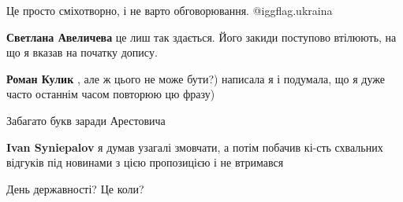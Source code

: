 \begin{itemize}
Це просто сміхотворно, і не варто обговорювання. @igg{flag.ukraina}

\begin{itemize}
 
\textbf{Светлана Авеличева} це лиш так здається. Його закиди поступово втілюють, на що я вказав на початку допису.

 
\textbf{Роман Кулик} , але ж цього не може бути?)
написала я і подумала, що я дуже часто останнім часом повторюю цю фразу)
\end{itemize}

 
Забагато букв заради Арестовича

\begin{itemize}
 
\textbf{Ivan Syniepalov} я думав узагалі змовчати, а потім побачив кі-сть схвальних відгуків під новинами з цією пропозицією і не втримався
\end{itemize}

 
День державності? Це коли?

\begin{itemize}
 

\end{itemize}
\end{itemize}
